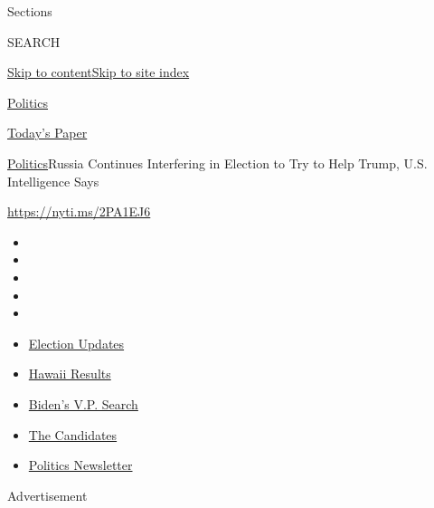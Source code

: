 Sections

SEARCH

\protect\hyperlink{site-content}{Skip to
content}\protect\hyperlink{site-index}{Skip to site index}

\href{https://www.nytimes.com/section/politics}{Politics}

\href{https://myaccount.nytimes.com/auth/login?response_type=cookie\&client_id=vi}{}

\href{https://www.nytimes.com/section/todayspaper}{Today's Paper}

\href{/section/politics}{Politics}\textbar{}Russia Continues Interfering
in Election to Try to Help Trump, U.S. Intelligence Says

\href{https://nyti.ms/2PA1EJ6}{https://nyti.ms/2PA1EJ6}

\begin{itemize}
\item
\item
\item
\item
\item
\end{itemize}

\begin{itemize}
\item
  \href{https://www.nytimes.com/2020/08/07/us/elections/biden-vs-trump.html?action=click\&pgtype=Article\&state=default\&region=TOP_BANNER\&context=storylines_menu}{Election
  Updates}
\item
  \href{https://www.nytimes.com/interactive/2020/08/08/us/elections/results-hawaii-primary-elections.html?action=click\&pgtype=Article\&state=default\&region=TOP_BANNER\&context=storylines_menu}{Hawaii
  Results}
\item
  \href{https://www.nytimes.com/article/biden-vice-president-2020.html?action=click\&pgtype=Article\&state=default\&region=TOP_BANNER\&context=storylines_menu}{Biden's
  V.P. Search}
\item
  \href{https://www.nytimes.com/interactive/2019/us/politics/2020-presidential-candidates.html?action=click\&pgtype=Article\&state=default\&region=TOP_BANNER\&context=storylines_menu}{The
  Candidates}
\item
  \href{https://www.nytimes.com/newsletters/politics?action=click\&pgtype=Article\&state=default\&region=TOP_BANNER\&context=storylines_menu}{Politics
  Newsletter}
\end{itemize}

Advertisement

